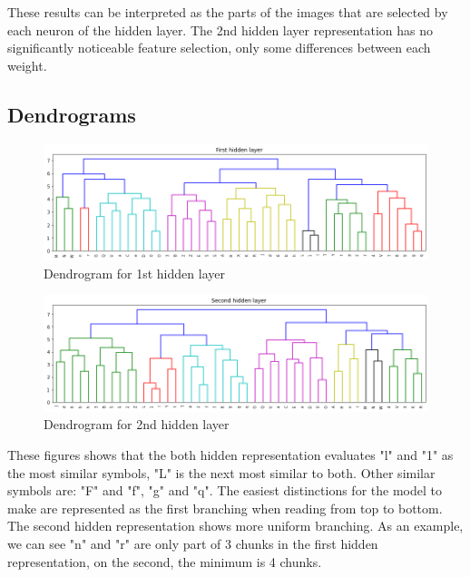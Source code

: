\documentclass[a4paper, 11pt]{article}
\begin{document}
			These results can be interpreted as the parts of the images that are selected by each neuron of the hidden layer.
			The 2nd hidden layer representation has no significantly noticeable feature selection, only some differences between each weight.
		
		\subsection{Dendrograms}
		
			\begin{figure}[H]
				\centering
				\includegraphics[width=.8\linewidth]{dend1.png}  
				\caption{Dendrogram for 1st hidden layer}
				\label{fig:dend1}
			\end{figure}
		
			\begin{figure}[H]
				\centering
				\includegraphics[width=.8\linewidth]{dend2.png}  
				\caption{Dendrogram for 2nd hidden layer}
				\label{fig:dend2}
			\end{figure}
		
			 These figures shows that the both hidden representation evaluates "l" and "1" as the most similar symbols, "L" is the next most similar to both.
			 Other similar symbols are: "F" and "f", "g" and "q".
			 The easiest distinctions for the model to make are represented as the first branching when reading from top to bottom.
			 The second hidden representation shows more uniform branching.
			 As an example, we can see "n" and "r" are only part of 3 chunks in the first hidden representation, on the second, the minimum is 4 chunks. 
			 
\end{document}

